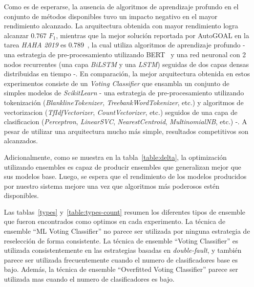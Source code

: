 Como es de esperarse, la ausencia de algoritmos de aprendizaje profundo en el conjunto de métodos disponibles tuvo un impacto negativo en el mayor rendimiento alcanzado.
La arquitectura obtenida con mayor rendimiento logra alcanzar $0.767$ $F_1$, mientras que la mejor solución reportada por AutoGOAL en la tarea \emph{HAHA 2019} es $0.789$~\parencite{estevez2020automatic}, la cual utiliza algoritmos de aprendizaje profundo - una estrategia de pre-procesamiento utilizando BERT~\parencite{devlin2018bert} y una red neuronal con 2 nodos recurrentes (una capa \emph{BiLSTM} y una \emph{LSTM}) seguidas de dos capas densas distribuidas en tiempo -.
En comparación, la mejor arquitectura obtenida en estos experimentos consiste de un \emph{Voting Classifier} que ensambla un conjunto de simples modelos de \emph{ScikitLearn} - una estrategia de pre-procesamiento utilizando tokenización (\emph{BlanklineTokenizer}, \emph{TreebankWordTokenizer}, etc.) y algoritmos de vectorizacion (\emph{TfIdfVectorizer}, \emph{CountVectorizer}, etc.) seguidos de una capa de clasificacion (\emph{Perceptron}, \emph{LinearSVC}, \emph{NearestCentroid}, \emph{MultinomialNB}, etc.) -.
A pesar de utilizar una arquitectura mucho más simple, resultados competitivos son alcanzados.

Adicionalmente, como se muestra en la tabla~\ref{table:delta}, la optimización utilizando ensembles es capaz de producir ensembles que generalizan mejor que sus modelos base.
Luego, se espera que el rendimiento de los modelos producidos por nuestro sistema mejore una vez que algoritmos más poderosos estén disponibles.

Las tablas~\ref{types} y~\ref{table:types-count} resumen los diferentes tipos de ensemble que fueron encontrados como optimos en cada experimento.
La técnica de ensemble ``ML Voting Classifier'' no parece ser utilizada por ninguna estrategia de reselección de forma consistente.
La técnica de ensemble ``Voting Classifier'' es utilizada consistentemente en las estrategias basadas en \emph{double-fault}, y también parece ser utilizada frecuentemente cuando el numero de clasificadores base es bajo.
Además, la técnica de ensemble ``Overfitted Voting Classifier'' parece ser utilizada mas cuando el numero de clasificadores es bajo.

